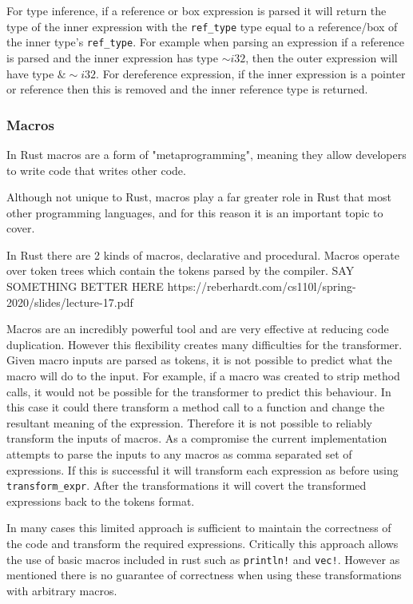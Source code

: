 \documentclass[ oneside,%
                    author={James Elgar},
                    degree={MEng},
                     title={Bidirectional transformer between functional and \\ object-oriented programming in Rust},
                  subtitle={}]{dissertation}
\newcommand{\rust}[1]{\texttt{#1}}
\begin{document}
For type inference, if a reference or box expression is parsed it will return the type of the inner expression with the \verb|ref_type| type equal to a reference/box of the inner type's \verb|ref_type|. For example when parsing an expression if a reference is parsed and the inner expression has type $\sim i32$, then the outer expression will have type $\& \sim i32$. For dereference expression, if the inner expression is a pointer or reference then this is removed and the inner reference type is returned.

\subsubsection{Macros}

In Rust macros are a form of "metaprogramming", meaning they allow developers to write code that writes other code. 

Although not unique to Rust, macros play a far greater role in Rust that most other programming languages, and for this reason it is an important topic to cover. 

In Rust there are 2 kinds of macros, declarative and procedural. Macros operate over token trees which contain the tokens parsed by the compiler. SAY SOMETHING BETTER HERE  https://reberhardt.com/cs110l/spring-2020/slides/lecture-17.pdf

Macros are an incredibly powerful tool and are very effective at reducing code duplication. However this flexibility creates many difficulties for the transformer. Given macro inputs are parsed as tokens, it is not possible to predict what the macro will do to the input. For example, if a macro was created to strip method calls, it would not be possible for the transformer to predict this behaviour. In this case it could there transform a method call to a function and change the resultant meaning of the expression. 
Therefore it is not possible to reliably transform the inputs of macros. As a compromise the current implementation attempts to parse the inputs to any macros as comma separated set of expressions. If this is successful it will transform each expression as before using \verb|transform_expr|. After the transformations it will covert the transformed expressions back to the tokens format.

In many cases this limited approach is sufficient to maintain the correctness of the code and transform the required expressions. Critically this approach allows the use of basic macros included in rust such as \rust{println!} and \rust{vec!}. However as mentioned there is no guarantee of correctness when using these transformations with arbitrary macros.
\end{document}
